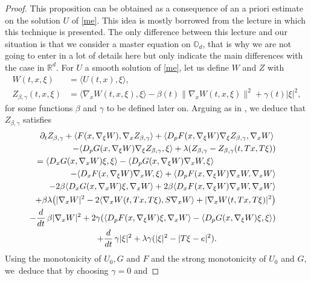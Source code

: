 \documentclass[JEP,XML,SOM,Unicode,NoEqCountersInSection,published]{cedram}
\theoremstyle{definition}
\begin{document}
\begin{proof}
This proposition can be obtained as a consequence of an a priori estimate on the solution $U$ of \eqref{me}. This idea is mostly borrowed from the lecture \cite{lions2007cours} in which this technique is presented. The only difference between this lecture and our situation is that we consider a master equation on $\mathbb{O}_d$, that is why we are not going to enter in a lot of details here but only indicate the main differences with the case in $\mathbb{R}^d$. For $U$ a smooth solution of \eqref{me}, let us define $W$ and $Z$ with
\begin{align*}
W(t,x,\xi) &= \langle U(t,x), \xi \rangle,\\
Z_{\beta,\gamma}(t,x,\xi) &= \langle \nabla_x W(t,x,\xi), \xi \rangle-\beta(t) \|\nabla_x W(t,x,\xi)\|^2+\gamma(t) |\xi|^2,
\end{align*}
for some functions $\beta$ and $\gamma$ to be defined later on. Arguing as in \cite{lions2007cours}, we deduce that $Z_{\beta,\gamma}$ satisfies
\begin{multline}\label{Zedp}
 \partial_t Z_{\beta, \gamma}+\langle F(x,\nabla_{\xi} W), \nabla_x Z_{\beta, \gamma}\rangle+\langle D_p F (x,\nabla_{\xi} W) \nabla_{\xi}Z_{\beta, \gamma} , \nabla_{x} W\rangle\\
 \shoveright{-\langle D_p G(x, \nabla_{\xi}W)\nabla_{\xi}Z_{\beta, \gamma}, \xi\rangle 
+ \lambda(Z_{\beta, \gamma}-Z_{\beta, \gamma}(t,Tx, T\xi))}\\
 \shoveleft{= \langle D_xG(x, \nabla_x W) \xi, \xi\rangle-\langle D_pG(x, \nabla_{\xi}W) \nabla_x W, \xi\rangle}\\
 \shoveright{-\langle D_x F(x, \nabla_{\xi} W) \nabla_x W, \xi\rangle
+ \langle D_p F(x, \nabla_{\xi}W) \nabla_x W, \nabla_x W\rangle}\\
\shoveright{- 2 \beta \langle D_x G(x, \nabla_x W)\xi, \nabla_x W\rangle+2 \beta \langle D_x F(x, \nabla_{\xi} W) \nabla_x W, \nabla_x W\rangle}\\
\shoveright{+\beta \lambda \bigl(|\nabla_x W|^2-2 \langle \nabla_x W(t, Tx, T \xi), S \nabla_x W\rangle+| \nabla_x W(t,Tx, T \xi)|^2 \bigr)} \\
\shoveright{- \frac{d}{dt}\, \beta |\nabla_x W|^2+2 \gamma(\langle D_p F (x,\nabla_{\xi} W) \xi , \nabla_{x} W\rangle-\langle D_p G(x, \nabla_{\xi}W)\xi, \xi\rangle)}\\
+\frac{d}{dt}\,\gamma |\xi|^2+\lambda \gamma (|\xi|^2-|T\xi-e|^2).
\end{multline}
Using the monotonicity of $U_0,G$ and $F$ and the strong monotonicity of $U_0$ and $G$, we~deduce that by choosing $\gamma = 0$ and

\end{proof}
\end{document}
